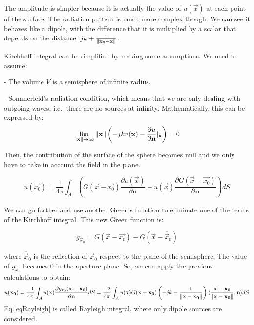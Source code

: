 The amplitude is simpler because it is actually the value of $u(\vec{x})$ at each point of the surface. The radiation pattern is much more complex though. We can see it behaves like a dipole, with the difference that it is multiplied by a scalar that depends on the distance: $jk + \frac{1}{\left\| \mathbf{x_0} - \mathbf{x} \right\|}$.

Kirchhoff integral can be simplified by making some assumptions. We need to assume:

- The volume $V$ is a semisphere of infinite radius.

- Sommerfeld’s radiation condition, which means that we are only dealing with outgoing waves, i.e., there are no sources at infinity. Mathematically, this can be expressed by:
\begin{equation}
\lim_{\left\| \mathbf{x} \right\|\to\infty} \left\| \mathbf{x} \right\| \left( -jku(\mathbf{x}) - \frac{\partial u}{\partial \mathbf{n}}\rvert_{\mathbf{x}} \right) = 0
\end{equation}

Then, the contribution of the surface of the sphere becomes null and we only have to take in account the field in the plane.

\begin{equation}
u(\vec{x_0}) = \frac{1}{4\pi} \int_{A} \left(G(\vec{x} - \vec{x_0}) \frac{\partial u(\vec{x})}{\partial \mathbf{n}} - u(\vec{x})\frac{\partial G(\vec{x} - \vec{x_0})}{\partial \mathbf{n}} \right) dS
\end{equation}

We can go farther and use another Green's function to eliminate one of the terms of the Kirchhoff integral. This new Green function is:

\begin{equation}
g_{\vec{x}_0} = G(\vec{x} - \vec{x_0}) - G(\vec{x} - \overline{\vec{x}}_0)
\end{equation}

where $\overline{\vec{x}}_0$ is the reflection of $\vec{x}_0$ respect to the plane of the semisphere. The value of $g_{\vec{x}_0}$ becomes $0$ in the aperture plane. So, we can apply the previous calculations to obtain:
\begin{equation}
u(\mathbf{x_0}) = \frac{-1}{4\pi} \int_{A} u(\mathbf{x})\frac{\partial g_{\mathbf{x}_0}(\mathbf{x} - \mathbf{x_0})}{\partial \mathbf{n}} dS = \frac{-2}{4\pi} \int_{A} u(\mathbf{x})G(\mathbf{x} - \mathbf{x_0})\left( -jk - \frac{1}{\left\| \mathbf{x} - \mathbf{x_0} \right\|}\right) \langle \frac{\mathbf{x} - \mathbf{x_0}}{\left\| \mathbf{x} - \mathbf{x_0} \right\|} , \mathbf{n} \rangle dS
\label{eqRayleigh}
\end{equation}
Eq.\ref{eqRayleigh} is called Rayleigh integral, where only dipole sources are considered.

